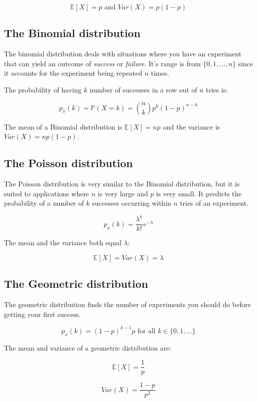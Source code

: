 \begin{dmath}
	{\mathbb{E}[X] = p} \textrm{ and } {Var(X) = p(1-p)}
\end{dmath}

\subsection{The Binomial distribution}

The binomial distribution deals with situations where you have an experiment
that can yield an outcome of {\it success} or {\it failure}. It's range is from
$\{0, 1, \dots, n\}$ since it accounts for the experiment being repeated $n$
times.

The probability of having $k$ number of successes in a row out of $n$ tries is:

\begin{dmath}
	{p_x(k) = \mathbb{P}(X = k) = {n \choose k}p^k(1-p)^{n-k}}
\end{dmath}

The mean of a Binomial distribution is $\mathbb{E}[X] = np$ and the variance is
$Var(X) = np(1-p)$.

\subsection{The Poisson distribution}

The Poisson distribution is very similar to the Binomial distribution, but it is
suited to applications where $n$ is very large and $p$ is very small. It
predicts the probability of a number of $k$ successes occurring within $n$ tries
of an experiment.

\begin{dmath}
	p_x(k) = \frac{\lambda^k}{k!}e^{-\lambda}
\end{dmath}

The mean and the variance both equal $\lambda$:

\begin{dmath}
	{\mathbb{E}[X] = Var(X) = \lambda}
\end{dmath}

\subsection{The Geometric distribution}

The geometric distribution finds the number of experiments you should do before
getting your first success.

\begin{dmath}
	p_x(k) = (1-p)^{k-1}p \textrm{ for all $k \in \{0, 1, \dots\}$}
\end{dmath}

The mean and variance of a geometric distribution are:

\begin{dmath}
	\mathbb{E}[X] = \frac{1}{p}
\end{dmath}

\begin{dmath}
	Var(X) = \frac{1-p}{p^2}
\end{dmath}